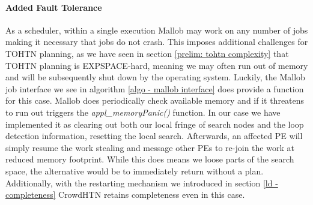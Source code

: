 \paragraph{Added Fault Tolerance}
As a scheduler, within a single execution Mallob may work on any number of jobs making it necessary that jobs do not crash. This imposes additional challenges for TOHTN planning, as we have seen in section \ref{prelim: tohtn complexity} that TOHTN planning is EXPSPACE-hard, meaning we may often run out of memory and will be subsequently shut down by the operating system. Luckily, the Mallob job interface we see in algorithm \ref{algo - mallob interface} does provide a function for this case. Mallob does periodically check available memory and if it threatens to run out triggers the \textit{appl\_memoryPanic()} function. In our case we have implemented it as clearing out both our local fringe of search nodes and the loop detection information, resetting the local search. Afterwards, an affected PE will simply resume the work stealing and message other PEs to re-join the work at reduced memory footprint. While this does means we loose parts of the search space, the alternative would be to immediately return without a plan. Additionally, with the restarting mechanism we introduced in section \ref{ld - completeness} CrowdHTN retains completeness even in this case.

